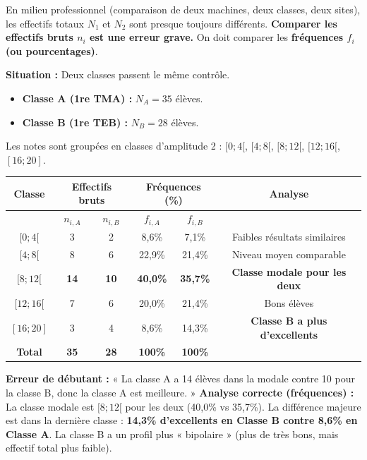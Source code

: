 \documentclass[11pt]{article}
\begin{document}
En milieu professionnel (comparaison de deux machines, deux classes, deux sites), les effectifs totaux $N_1$ et $N_2$ sont presque toujours différents. \textbf{Comparer les effectifs bruts $n_i$ est une erreur grave.} On doit comparer les \textbf{fréquences $f_i$ (ou pourcentages)}.

\begin{exemplebox}
\textbf{Situation :} Deux classes passent le même contrôle.
\begin{itemize}
    \item \textbf{Classe A (1re TMA) :} $N_A = 35$ élèves.
    \item \textbf{Classe B (1re TEB) :} $N_B = 28$ élèves.
\end{itemize}
Les notes sont groupées en classes d'amplitude 2 : $[0;4[$, $[4;8[$, $[8;12[$, $[12;16[$, $[16;20]$.

\begin{center}
\begin{tabular}{|c|c|c|c|c|c|}\hline
Classe & \multicolumn{2}{c|}{Effectifs bruts} & \multicolumn{2}{c|}{Fréquences (\%)} & Analyse \\ \hline
& $n_{i,A}$ & $n_{i,B}$ & $f_{i,A}$ & $f_{i,B}$ & \\ \hline
$[0 ; 4[$ & 3 & 2 & 8,6\% & 7,1\% & Faibles résultats similaires \\ \hline
$[4 ; 8[$ & 8 & 6 & 22,9\% & 21,4\% & Niveau moyen comparable \\ \hline
$[8 ; 12[$ & \textbf{14} & \textbf{10} & \textbf{40,0\%} & \textbf{35,7\%} & \textbf{Classe modale pour les deux} \\ \hline
$[12 ; 16[$ & 7 & 6 & 20,0\% & 21,4\% & Bons élèves \\ \hline
$[16 ; 20]$ & 3 & 4 & 8,6\% & 14,3\% & \textbf{Classe B a plus d'excellents} \\ \hline
\textbf{Total} & \textbf{35} & \textbf{28} & \textbf{100\%} & \textbf{100\%} & \\ \hline
\end{tabular}
\end{center}

\textbf{Erreur de débutant :} « La classe A a 14 élèves dans la modale contre 10 pour la classe B, donc la classe A est meilleure. »
\textbf{Analyse correcte (fréquences) :} La classe modale est $[8;12[$ pour les deux (40,0\% vs 35,7\%). La différence majeure est dans la dernière classe : \textbf{14,3\% d'excellents en Classe B contre 8,6\% en Classe A}. La classe B a un profil plus « bipolaire » (plus de très bons, mais effectif total plus faible).
\end{exemplebox}
\end{document}
